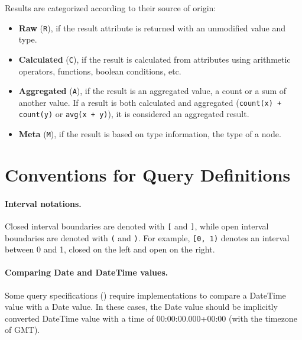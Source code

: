 Results are categorized according to their source of origin:

\begin{itemize}
	\item \textbf{Raw} (\texttt{R}), if the result attribute is returned with an unmodified value and type.
	\item \textbf{Calculated} (\texttt{C}), if the result is calculated from attributes using arithmetic operators, functions, boolean conditions, etc.
	\item \textbf{Aggregated} (\texttt{A}), if the result is an aggregated value, \eg a count or a sum of another value. If a result is both calculated and aggregated (\eg \lstinline{count(x) + count(y)} or \lstinline{avg(x + y)}), it is considered an aggregated result.
	\item \textbf{Meta} (\texttt{M}), if the result is based on type information, \eg the type of a node.
\end{itemize}



\section{Conventions for Query Definitions}

\paragraph{Interval notations.}

Closed interval boundaries are denoted with 
\texttt{[} 
and \texttt{]}, while open interval boundaries are denoted with \texttt{(} and 
\texttt{)}. For example, \texttt{[0, 1)} denotes an interval between 0 and 1, 
closed on the left and open on the right.

\paragraph{Comparing Date and DateTime values.}

Some query specifications (\eg {}) require implementations to compare a
\textsf{DateTime} value with a \textsf{Date} value. In these cases, the 
\textsf{Date} value should be implicitly converted \textsf{DateTime} value 
with a time of 00:00:00.000+00:00 (\ie with the timezone of GMT).

